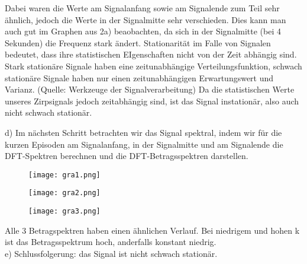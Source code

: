 \documentclass[fleqn,a4paper,12pt]{article}
\begin{document}
Dabei waren die Werte am Signalanfang sowie am Signalende zum Teil sehr ähnlich, jedoch die Werte in der Signalmitte sehr verschieden.
Dies kann man auch gut im Graphen aus 2a) beaobachten, da sich in der Signalmitte (bei 4 Sekunden) die Frequenz stark ändert.
Stationarit{\"a}t im Falle von Signalen bedeutet, dass ihre statistischen EIgenschaften nicht von der Zeit abh{\"a}ngig sind.
Stark stationäre Signale haben eine zeitunabh{\"a}ngige Verteilungsfunktion, schwach station{\"a}re Signale haben nur einen zeitunabhängigen Erwartungswert und Varianz. (Quelle: Werkzeuge der Signalverarbeitung)
Da die statistischen Werte unseres Zirpsignals jedoch zeitabh{\"a}ngig sind, ist das Signal instation{\"a}r, also auch nicht schwach station{\"a}r.

\newpage
d) Im nächsten Schritt betrachten wir das Signal spektral, indem wir für die kurzen Episoden am Signalanfang, in der Signalmitte und am Signalende die DFT-Spektren berechnen und die DFT-Betragsspektren darstellen.

\begin{center}
\begin{figure}[h]
    \begin{scriptsize}
  \begin{center}
      \texttt{[image: gra1.png]}
      \end{center}
 	\end{scriptsize}
  \end{figure}
\end{center}

\begin{center}
\begin{figure}[h]
    \begin{scriptsize}
  \begin{center}
      \texttt{[image: gra2.png]}
      \end{center}
 	\end{scriptsize}
  \end{figure}
\end{center}

\begin{center}
\begin{figure}[h]
    \begin{scriptsize}
  \begin{center}
      \texttt{[image: gra3.png]}
      \end{center}
 	\end{scriptsize}
  \end{figure}
\end{center}

\newpage
Alle 3 Betragspektren haben einen {\"a}hnlichen Verlauf. Bei niedrigem und hohen k ist das Betragsspektrum hoch, anderfalls konstant niedrig. \\


e) Schlussfolgerung: das Signal ist nicht schwach station{\"a}r.
\end{document}
